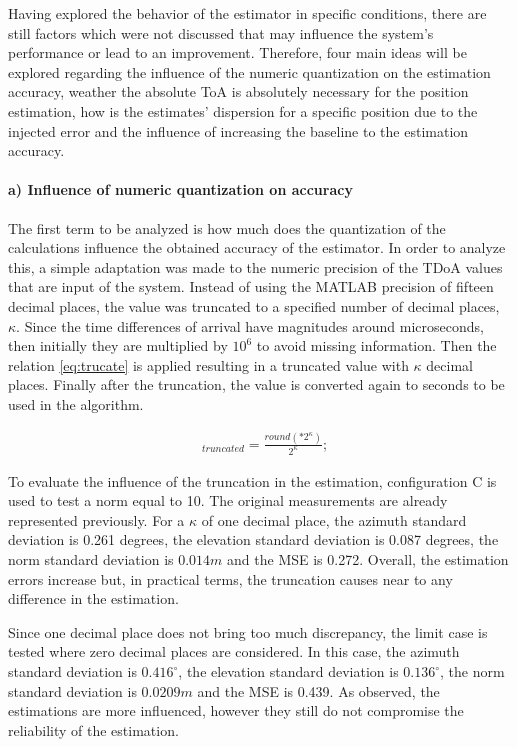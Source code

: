 Having explored the behavior of the estimator in specific conditions, there are still factors which were not discussed that may influence the system's performance or lead to an improvement. Therefore, four main ideas will be explored regarding the influence of the numeric quantization on the estimation accuracy, weather the absolute ToA is absolutely necessary for the position estimation, how is the estimates' dispersion for a specific position due to the injected error and the influence of increasing the baseline to the estimation accuracy.

\paragraph{a) Influence of numeric quantization on accuracy}

The first term to be analyzed is how much does the quantization of the calculations influence the obtained accuracy of the estimator. In order to analyze this, a simple adaptation was made to the numeric precision of the TDoA values that are input of the system. Instead of using the MATLAB precision of fifteen decimal places, the value was truncated to a specified number of decimal places, $\kappa$.
Since the time differences of arrival have magnitudes around microseconds, then initially they are multiplied by $10^6$ to avoid missing information. Then the relation \ref{eq:trucate} is applied resulting in a truncated value with $\kappa$ decimal places. Finally after the truncation, the value is converted again to seconds to be used in the algorithm.

\begin{eqnarray}
	&_{truncated} = \frac{round(*2^{\kappa})}{2^{\kappa}};
	\label{eq:trucate}
\end{eqnarray}

To evaluate the influence of the truncation in the estimation, configuration C is used to test a norm equal to 10. The original measurements are already represented previously. For a $\kappa$ of one decimal place, the azimuth standard deviation is 0.261 degrees, the elevation standard deviation is 0.087 degrees, the norm standard deviation is $0.014m$ and the MSE is 0.272. Overall, the estimation errors increase but, in practical terms, the truncation causes near to any difference in the estimation. 

Since one decimal place does not bring too much discrepancy, the limit case is tested where zero decimal places are considered. In this case, the azimuth standard deviation is $0.416^{\circ}$, the elevation standard deviation is $0.136^{\circ}$, the norm standard deviation is $0.0209m$ and the MSE is 0.439. As observed, the estimations are more influenced, however they still do not compromise the reliability of the estimation.

